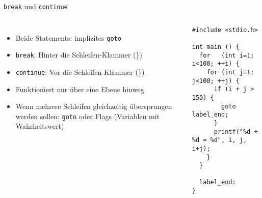 \begin{frame}[fragile]{\texttt{break} und \texttt{continue}}
%
\begin{columns}[T]
\begin{itemize}
\item Beide Statements: implizites \texttt{goto}
\item \texttt{break}: Hinter die Schleifen-Klammer (\})
\item \texttt{continue}: Vor die Schleifen-Klammer (\})
\item Funktioniert nur über eine Ebene hinweg
\item Wenn mehrere Schleifen gleichzeitig übersprungen werden sollen: \texttt{goto} oder Flags
	(Variablen mit Wahrheitswert)
\end{itemize}
%
\begin{codebox}
\begin{verbatim}
#include <stdio.h>

int main () {
  for   (int i=1; i<100; ++i) {
    for (int j=1; j<100; ++j) {
      if (i + j > 150) {
        goto label_end;
      }
      printf("%d + %d = %d", i, j, i+j);
    }
  }
  
  label_end:
}
\end{verbatim}
\end{codebox}
%
\end{columns}
%
\end{frame}


